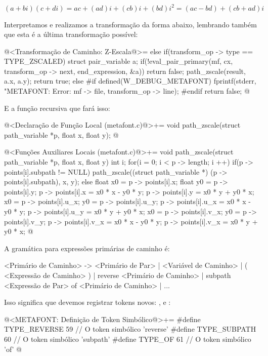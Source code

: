 {$$
(a+bi)(c+di) = ac + (ad)i + (cb)i + (bd)i^2 = (ac - bd) + (cb+ad)i
$$

Interpretamos e realizamos a transformação da forma abaixo, lembrando
também que esta é a última transformação possível:

\iniciocodigo
 @<Transformação de Caminho: Z-Escala@>=
else if(transform_op -> type == TYPE_ZSCALED){
  struct pair_variable a;
  if(!eval_pair_primary(mf, cx, transform_op -> next, end_expression, &a))
    return false;
  path_zscale(result, a.x, a.y);  
  return true;
}
else{
#if defined(W_DEBUG_METAFONT)
  fprintf(stderr, "METAFONT: Error: %
          mf -> file, transform_op -> line);
#endif
  return false;
}
@
\fimcodigo

E a função recursiva que fará isso:

\iniciocodigo
@<Declaração de Função Local (metafont.c)@>+=
void path_zscale(struct path_variable *p, float x, float y);
@
\fimcodigo

\iniciocodigo
@<Funções Auxiliares Locais (metafont.c)@>+=
void path_zscale(struct path_variable *p, float x, float y){
  int i;
  for(i = 0; i < p -> length; i ++){
    if(p -> points[i].subpath != NULL)
      path_zscale((struct path_variable *) (p -> points[i].subpath),
                  x, y);
    else{
      float x0 = p -> points[i].x;
      float y0 = p -> points[i].y;
      p -> points[i].x = x0 * x - y0 * y;
      p -> points[i].y = x0 * y + y0 * x;
      x0 = p -> points[i].u_x;
      y0 = p -> points[i].u_y;
      p -> points[i].u_x = x0 * x - y0 * y;
      p -> points[i].u_y = x0 * y + y0 * x;
      x0 = p -> points[i].v_x;
      y0 = p -> points[i].v_y;
      p -> points[i].v_x = x0 * x - y0 * y;
      p -> points[i].v_x = x0 * y + y0 * x;
    }
  }
}
@
\fimcodigo



A gramática para expressões primárias de caminho é:

\alinhaverbatim
<Primário de Caminho> -> <Primário de Par> | <Variável de Caminho> |
                       ( <Expressão de Caminho> ) |
                       reverse <Primário de Caminho> |
                       subpath <Expressão de Par> of <Primário de Caminho> |
                       ...
\alinhanormal

Isso significa que devemos registrar tokens
novos: ,  e :

\iniciocodigo
@<METAFONT: Definição de Token Simbólico@>+=
#define TYPE_REVERSE        59 // O token simbólico 'reverse'
#define TYPE_SUBPATH        60 // O token simbólico 'subpath'
#define TYPE_OF             61 // O token simbólico 'of'
@
\fimcodigo

}

